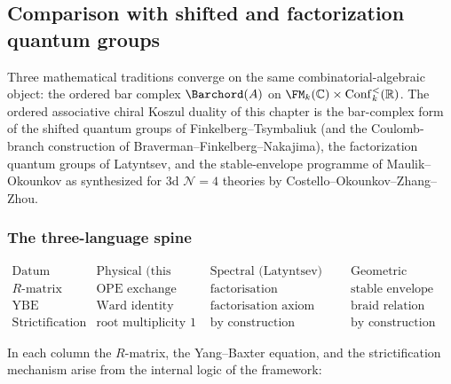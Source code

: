 \subsection{Comparison with shifted and factorization quantum groups}
\label{subsec:shifted-factorization-comparison}

Three mathematical traditions converge on the same combinatorial-algebraic
object: the ordered bar complex $\Barchord(A)$ on
$\FM_k(\mathbb{C})\times\mathrm{Conf}_k^<(\mathbb{R})$. The ordered
associative chiral Koszul duality of this chapter is the bar-complex
form of the shifted quantum groups of Finkelberg--Tsymbaliuk (and the
Coulomb-branch construction of Braverman--Finkelberg--Nakajima), the
factorization quantum groups of Latyntsev, and the stable-envelope
programme of Maulik--Okounkov as synthesized for 3d
$\mathcal{N}=4$ theories by Costello--Okounkov--Zhang--Zhou.

\subsubsection*{The three-language spine}

\[
\begin{array}{c|c|c|c}
\text{Datum} & \text{Physical (this work)} & \text{Spectral (Latyntsev)}
 & \text{Geometric (COZZ)} \\
\hline
R\text{-matrix} & \text{OPE exchange} & \text{factorisation isomorphism} &
 \text{stable envelope} \\
\text{YBE} & \text{Ward identity} & \text{factorisation axiom} &
 \text{braid relation} \\
\text{Strictification} & \text{root multiplicity 1} &
 \text{by construction} & \text{by construction}
\end{array}
\]

In each column the $R$-matrix, the Yang--Baxter equation, and the
strictification mechanism arise from the internal logic of the
framework:


